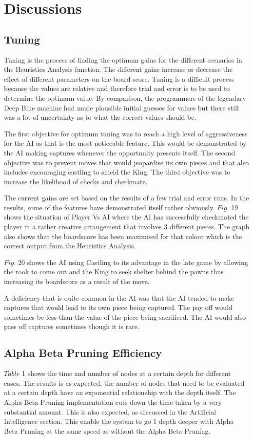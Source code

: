 \documentclass[11pt,a4paper]{article}
\begin{document}
\newpage
\section{Discussions}

\subsection{Tuning}
\indent\indent Tuning is the process of finding the optimum gains for the different scenarios in the Heuristics Analysis function. The different gains increase or decrease the effect of different parameters on the board score. Tuning is a difficult process because the values are relative and therefore trial and error is to be used to determine the optimum value. By comparison, the programmers of the legendary Deep Blue machine had made plausible initial guesses for values but there still was a lot of uncertainty as to what the correct values should be.\cite{chess5}

	The first objective for optimum tuning was to reach a high level of aggressiveness for the AI as that is the most noticeable feature. This would be demonstrated by the AI making captures whenever the opportunity presents itself.  The second objective was to prevent moves that would jeopardise its own pieces and that also includes encouraging castling to shield the King. The third objective was to increase the likelihood of checks and checkmate.

	The current gains are set based on the results of a few trial and error runs. In the results, some of the features have demonstrated itself rather obviously. $Fig.$ 19 shows the situation of Player Vs AI where the AI has successfully checkmated the player in a rather creative arrangement that involves 3 different pieces. The graph also shows that the boardscore has been maximised for that colour which is the correct output from the Heuristics Analysis.

	$Fig.$ 20 shows the AI using Castling to its advantage in the late game by allowing the rook to come out and the King to seek shelter behind the pawns thus increasing its boardscore as a result of the move. 

	A deficiency that is quite common in the AI was that the AI tended to make captures that would lead to its own piece being captured. The pay off would sometimes be less than the value of the piece being sacrificed. The AI would also pass off captures sometimes though it is rare.

\subsection{Alpha Beta Pruning Efficiency}
\indent\indent $Table$ 1 shows the time and number of nodes at a certain depth for different cases. The results is as expected, the number of nodes that need to be evaluated at a certain depth have an exponential relationship with the depth itself. The Alpha Beta Pruning implementation cuts down the time taken by a very substantial amount. This is also expected, as discussed in the Artificial Intelligence section. This enable the system to go 1 depth deeper with Alpha Beta Pruning at the same speed as without the Alpha Beta Pruning.
\end{document}
